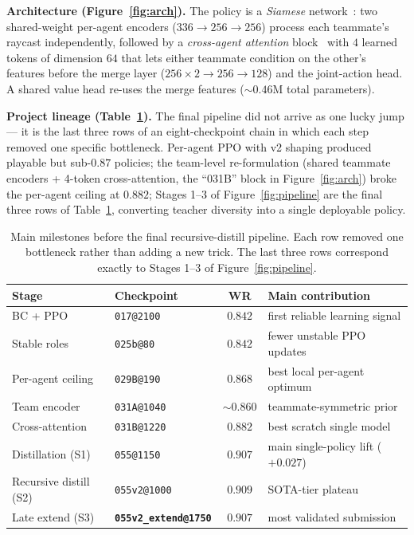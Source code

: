 \documentclass{article}
\begin{document}
\textbf{Architecture (Figure~\ref{fig:arch}).}  The policy is a \emph{Siamese} network~\citep{bromley1993siamese}: two shared-weight per-agent encoders ($336\!\to\!256\!\to\!256$) process each teammate's raycast independently, followed by a \emph{cross-agent attention} block~\citep{vaswani2017attention} with $4$ learned tokens of dimension $64$ that lets either teammate condition on the other's features before the merge layer ($256{\times}2\!\to\!256\!\to\!128$) and the joint-action head.  A shared value head re-uses the merge features ($\sim\!0.46$M total parameters).

\textbf{Project lineage (Table~\ref{tab:lineage}).}  The final pipeline did not arrive as one lucky jump --- it is the last three rows of an eight-checkpoint chain in which each step removed one specific bottleneck.  Per-agent PPO with v2 shaping produced playable but sub-$0.87$ policies; the team-level re-formulation (shared teammate encoders + 4-token cross-attention, the ``031B'' block in Figure~\ref{fig:arch}) broke the per-agent ceiling at $0.882$; Stages 1--3 of Figure~\ref{fig:pipeline} are the final three rows of Table~\ref{tab:lineage}, converting teacher diversity into a single deployable policy.

\begin{table}[ht]
\centering\small
\caption{Main milestones before the final recursive-distill pipeline.  Each row removed one bottleneck rather than adding a new trick.  The last three rows correspond exactly to Stages 1--3 of Figure~\ref{fig:pipeline}.}
\label{tab:lineage}
\begin{tabular}{llcl}
\toprule
Stage & Checkpoint & WR & Main contribution \\
\midrule
BC + PPO              & \texttt{017@2100}            & $0.842$        & first reliable learning signal \\
Stable roles          & \texttt{025b@80}             & $0.842$        & fewer unstable PPO updates \\
Per-agent ceiling     & \texttt{029B@190}            & $0.868$        & best local per-agent optimum \\
Team encoder          & \texttt{031A@1040}           & $\sim\!0.860$  & teammate-symmetric prior \\
Cross-attention       & \texttt{031B@1220}           & $0.882$        & best scratch single model \\
Distillation (S1)     & \texttt{055@1150}            & $0.907$        & main single-policy lift ($+0.027$) \\
Recursive distill (S2)& \texttt{055v2@1000}          & $0.909$        & SOTA-tier plateau \\
Late extend (S3)      & \textbf{\texttt{055v2\_extend@1750}} & $\mathbf{0.907}$ & most validated submission \\
\bottomrule
\end{tabular}
\vspace{-4pt}
\end{table}
\end{document}
